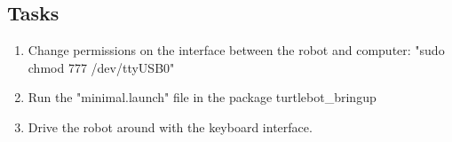 \documentclass[12pt]{article}
\newenvironment{task}[2][Task]{\begin{trivlist}
\item[\hskip \labelsep {\bfseries #1}\hskip \labelsep {\bfseries #2.}]}{\end{trivlist}}
\begin{document}
\subsection*{Tasks}

\begin{task}{1. Run and observe the keyboard tele-operation provided by ROS.}
\end{task}
\begin{enumerate}
\item Change permissions on the interface between the robot and computer: "sudo chmod 777 /dev/ttyUSB0"
\item Run the "minimal.launch" file in the package turtlebot\_bringup
\item Drive the robot around with the keyboard interface.
\end{enumerate}


\begin{task}{2. Create a ROS package implementing keyboard tele-operation}
\end{task}
\end{document}
